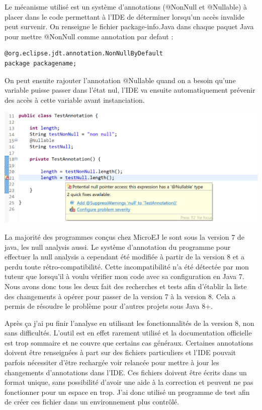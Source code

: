 \documentclass[french,a4paper,12pt]{report}
\begin{document}
Le mécanisme utilisé est un système d'annotations (@NonNull et @Nullable) à placer dans le code permettant à l'IDE de déterminer lorsqu'un accès invalide peut survenir. On renseigne le fichier package-info.Java dans chaque paquet Java pour mettre @NonNull comme annotation par defaut :
\begin{lstlisting}
@org.eclipse.jdt.annotation.NonNullByDefault
package packagename;
\end{lstlisting}
On peut ensuite rajouter l'annotation @Nullable quand on a besoin qu'une variable puisse passer dans l'état nul, l'IDE va ensuite automatiquement prévenir des accès à cette variable avant instanciation.

\begin{center}
  \includegraphics[width=\textwidth]{ressources/images/nonnull.png}
\end{center}


La majorité des programmes conçus chez MicroEJ le sont sous la version 7 de java, les null analysis aussi. Le système d'annotation du programme pour effectuer la null analysis a cependant été modifiée à partir de la version 8 et a perdu toute rétro-compatibilité. Cette incompatibilité n'a été détectée par mon tuteur que lorsqu'il à voulu vérifier mon code avec sa configuration en Java 7. Nous avons donc tous les deux fait des recherches et tests afin d'établir la liste des changements à opérer pour passer de la version 7 à la version 8. 
Cela a permis de résoudre le problème pour d'autres projets sous Java 8+.

Après ça j'ai pu finir l'analyse en utilisant les fonctionnalités de la version 8, non sans difficultés. L’outil est en effet rarement utilisé et la documentation officielle est trop sommaire et ne couvre que certains cas généraux. Certaines annotations doivent être renseignées à part sur des fichiers particuliers et l'IDE pouvait parfois nécessiter d'être rechargée voir relancée pour mettre à jour les changements d'annotations dans l'IDE. Ces fichiers doivent être écrits dans un format unique, sans possibilité d'avoir une aide à la correction et peuvent ne pas fonctionner pour un espace en trop. J'ai donc utilisé un programme de test afin de créer ces fichier dans un environnement plus contrôlé.
\end{document}

